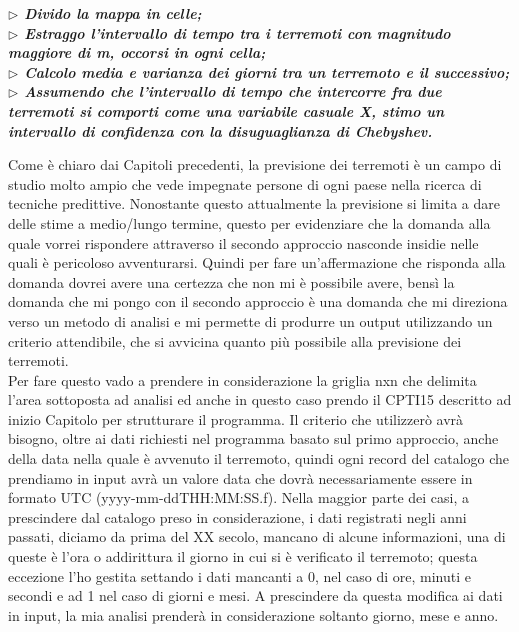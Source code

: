 \begin{displayquote}
\textit{\textbf{$\rhd$ Divido la mappa in celle;}}\\
\textit{\textbf{$\rhd$ Estraggo l'intervallo di tempo tra i terremoti con magnitudo maggiore di m, occorsi in ogni cella;}}\\
\textit{\textbf{$\rhd$ Calcolo media e varianza dei giorni tra un terremoto e il successivo;}}\\
\textit{\textbf{$\rhd$ Assumendo che l'intervallo di tempo che intercorre fra due terremoti si comporti come una variabile casuale X, stimo un intervallo di confidenza con la disuguaglianza di Chebyshev.}}
\end{displayquote}

Come \`e chiaro dai Capitoli precedenti, la previsione dei terremoti \`e un campo di studio molto ampio che vede impegnate persone di ogni paese nella ricerca di tecniche predittive. Nonostante questo attualmente la previsione si limita a dare delle stime a medio/lungo termine, questo per evidenziare che la domanda alla quale vorrei rispondere attraverso il secondo approccio nasconde insidie nelle quali \`e pericoloso avventurarsi. Quindi per fare un'affermazione che risponda alla domanda dovrei avere una certezza che non mi \`e possibile avere, bens\`i la domanda che mi pongo con il secondo approccio \`e una domanda che mi direziona verso un metodo di analisi e mi permette di produrre un output utilizzando un criterio attendibile, che si avvicina quanto pi\`u possibile alla previsione dei terremoti.\\
Per fare questo vado a prendere in considerazione la griglia nxn che delimita l'area sottoposta ad analisi ed anche in questo caso prendo il CPTI15 descritto ad inizio Capitolo per strutturare il programma. Il criterio che utilizzer\`o avr\`a bisogno, oltre ai dati richiesti nel programma basato sul primo approccio, anche della data nella quale \`e avvenuto il terremoto, quindi ogni record del catalogo che prendiamo in input avr\`a un valore data che dovr\`a necessariamente essere in formato UTC (yyyy-mm-ddTHH:MM:SS.f). Nella maggior parte dei casi, a prescindere dal catalogo preso in considerazione, i dati registrati negli anni passati, diciamo da prima del XX secolo, mancano di alcune informazioni, una di queste \`e l'ora o addirittura il giorno in cui si \`e verificato il terremoto; questa eccezione l'ho gestita settando i dati mancanti a 0, nel caso di ore, minuti e secondi e ad 1 nel caso di giorni e mesi. A prescindere da questa modifica ai dati in input, la mia analisi prender\`a in considerazione soltanto giorno, mese e anno.\\
